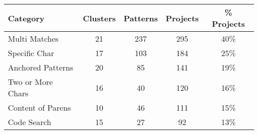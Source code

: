 \begin{adjustbox}{width=0.95\textwidth}
\begin{tabular}{lcccc}
\toprule
\textbf{Category} & \textbf{Clusters} & \textbf{Patterns} & \textbf{Projects} & \textbf{\% Projects} \\  \midrule
Multi Matches & 21 & 237 & 295 & 40\% \\
\midrule
Specific Char & 17 & 103 & 184 & 25\% \\
\midrule
Anchored Patterns & 20 & 85 & 141 & 19\% \\
\midrule
Two or More Chars & 16 & 40 & 120 & 16\% \\
\midrule
Content of Parens & 10 & 46 & 111 & 15\% \\
\midrule
Code Search & 15 & 27 & 92 & 13\% \\
\bottomrule
\end{tabular}
\end{adjustbox}

